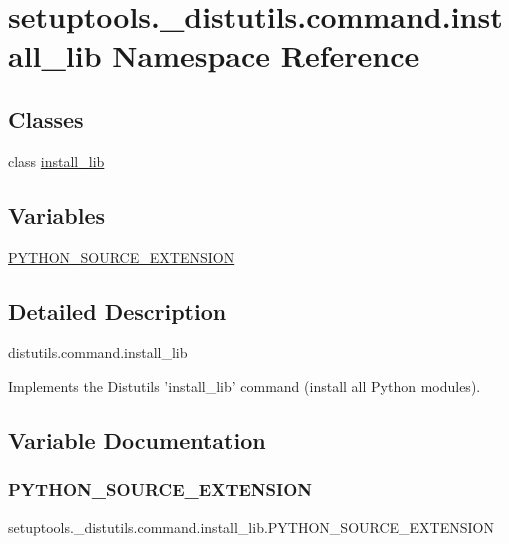 \hypertarget{namespacesetuptools_1_1__distutils_1_1command_1_1install__lib}{}\section{setuptools.\+\_\+distutils.\+command.\+install\+\_\+lib Namespace Reference}
\label{namespacesetuptools_1_1__distutils_1_1command_1_1install__lib}
\subsection*{Classes}
\begin{DoxyCompactItemize}
\item 
class \hyperlink{classsetuptools_1_1__distutils_1_1command_1_1install__lib_1_1install__lib}{install\+\_\+lib}
\end{DoxyCompactItemize}
\subsection*{Variables}
\begin{DoxyCompactItemize}
\item 
\hyperlink{namespacesetuptools_1_1__distutils_1_1command_1_1install__lib_a4e553e47f7568d649d0fa46b34c212c8}{P\+Y\+T\+H\+O\+N\+\_\+\+S\+O\+U\+R\+C\+E\+\_\+\+E\+X\+T\+E\+N\+S\+I\+ON}
\end{DoxyCompactItemize}


\subsection{Detailed Description}
\begin{DoxyVerb}distutils.command.install_lib

Implements the Distutils 'install_lib' command
(install all Python modules).\end{DoxyVerb}
 

\subsection{Variable Documentation}
\mbox{\label{namespacesetuptools_1_1__distutils_1_1command_1_1install__lib_a4e553e47f7568d649d0fa46b34c212c8}} 
\subsubsection{\texorpdfstring{P\+Y\+T\+H\+O\+N\+\_\+\+S\+O\+U\+R\+C\+E\+\_\+\+E\+X\+T\+E\+N\+S\+I\+ON}{PYTHON\_SOURCE\_EXTENSION}}
{\footnotesize\ttfamily setuptools.\+\_\+distutils.\+command.\+install\+\_\+lib.\+P\+Y\+T\+H\+O\+N\+\_\+\+S\+O\+U\+R\+C\+E\+\_\+\+E\+X\+T\+E\+N\+S\+I\+ON}

